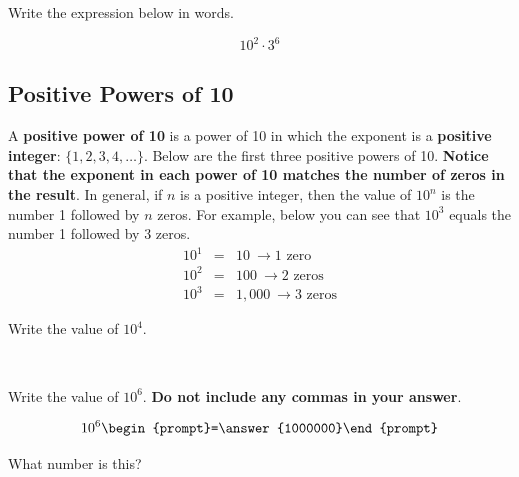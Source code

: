 \documentclass{ximera}
\begin{document}
\begin{problem} Write the expression below in words.

\[  10^2 \cdot 3^6 \]

\begin{multipleChoice}
  \end{multipleChoice}

\end{problem}


\subsection*{Positive Powers of 10}

A \textbf{positive power of 10} is a power of 10 in which the exponent is a \textbf{positive integer}: $\{1, 2, 3, 4, \ldots\}.$
Below are the first three positive powers of 10.  \textbf{Notice that the exponent in each power of 10 matches the number of zeros in the result}.  In general, if $n$ is a positive integer, then the value of $10^n$ is the number 1 followed by $n$ zeros.  For example, below you can see that $10^3$ equals the number 1 followed by 3 zeros.
\begin{eqnarray*}
10^1 &=& 10 \ \rightarrow \textrm{1 zero}\\
10^2 &=& 100  \ \rightarrow \textrm{2 zeros} \\
10^3 &=& 1,000 \ \rightarrow \textrm{3 zeros}
\end{eqnarray*}


\begin{problem} Write the value of $10^4.$

~ \\[1em]  %

\begin{multipleChoice}
  \end{multipleChoice}

\end{problem}

\begin{problem} Write the value of $10^6.$  \textbf{Do not include any commas in your answer}. 


\[ 10^6 \begin{prompt}=\answer{1000000}\end{prompt} \]

What number is this?

\begin{multipleChoice}
  \end{multipleChoice}


\end{problem}
\end{document}
